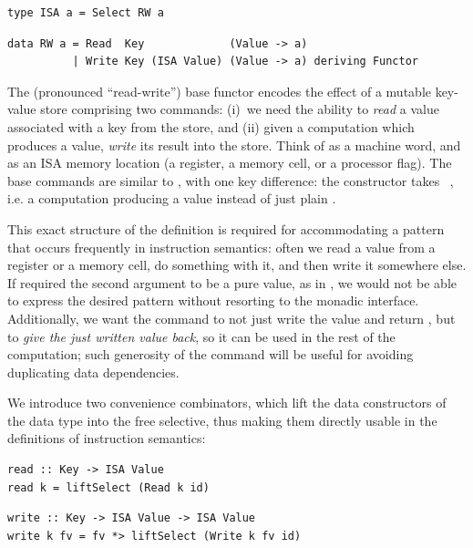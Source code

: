 \vspace{1mm}
\begin{verbatim}
type ISA a = Select RW a
\end{verbatim}
\vspace{1mm}
\begin{verbatim}
data RW a = Read  Key             (Value -> a)
          | Write Key (ISA Value) (Value -> a) deriving Functor
\end{verbatim}
\vspace{1mm}

\noindent
The  (pronounced ``read-write'') base functor encodes the effect of a
mutable key-value store comprising two commands: (i)~we need the ability to
\emph{read} a value associated with a key from the store, and (ii) given a
computation which produces a value, \emph{write} its result into the store.
Think of  as a machine word, and  as an ISA memory location
(a register, a memory cell, or a processor flag). The base commands are similar
to , with one key difference: the  constructor takes
~, i.e. a computation producing a value instead of just plain
.

This exact structure of the definition is required for accommodating a pattern
that occurs frequently in instruction semantics: often we read a value from a
register or a memory cell, do something with it, and then write it somewhere
else. If  required the second argument to be a pure value, as in
, we would not be able to express the desired pattern without
resorting to the monadic interface. Additionally, we want the 
command to not just write the value and return \hs{()}, but to \emph{give the
just written value back}, so it can be used in the rest of the computation; such
generosity of the  command will be useful for avoiding duplicating
data dependencies.

We introduce two convenience combinators, which lift the data constructors of
the  data type into the free selective, thus making them directly usable
in the definitions of instruction semantics:

\vspace{1mm}
\begin{verbatim}
read :: Key -> ISA Value
read k = liftSelect (Read k id)
\end{verbatim}
\vspace{1mm}
\begin{verbatim}
write :: Key -> ISA Value -> ISA Value
write k fv = fv *> liftSelect (Write k fv id)
\end{verbatim}
\vspace{1mm}

